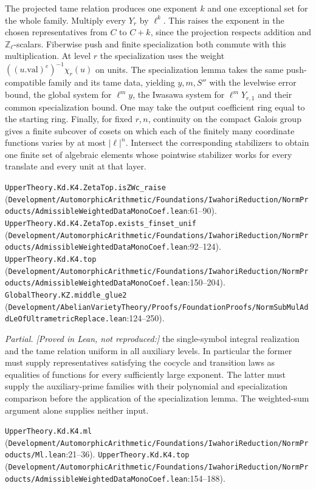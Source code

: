 The projected tame relation produces one exponent $k$ and one exceptional set for the whole family. Multiply every $Y_r$ by $\ell^k$. This raises the exponent in the chosen representatives from $C$ to $C+k$, since the projection respects addition and $\mathbb Z_\ell$-scalars. Fiberwise push and finite specialization both commute with this multiplication. At level $r$ the specialization uses the weight $((u.\mathrm{val})^e)^{-1}\chi_r(u)$ on units. The specialization lemma takes the same push-compatible family and its tame data, yielding $y,m,S''$ with the levelwise error bound, the global system for $\ell^m y$, the Iwasawa system for $\ell^m Y_{r,1}$ and their common specialization bound. One may take the output coefficient ring equal to the starting ring. Finally, for fixed $r,n$, continuity on the compact Galois group gives a finite subcover of cosets on which each of the finitely many coordinate functions varies by at most $|\ell|^n$. Intersect the corresponding stabilizers to obtain one finite set of algebraic elements whose pointwise stabilizer works for every translate and every unit at that layer.
\par{\footnotesize \nolinkurl{UpperTheory.Kd.K4.ZetaTop.isZWc_raise} (\nolinkurl{Development/AutomorphicArithmetic/Foundations/IwahoriReduction/NormProducts/AdmissibleWeightedDataMonoCoef.lean}\allowbreak:61--90). \nolinkurl{UpperTheory.Kd.K4.ZetaTop.exists_finset_unif} (\nolinkurl{Development/AutomorphicArithmetic/Foundations/IwahoriReduction/NormProducts/AdmissibleWeightedDataMonoCoef.lean}\allowbreak:92--124). \nolinkurl{UpperTheory.Kd.K4.top} (\nolinkurl{Development/AutomorphicArithmetic/Foundations/IwahoriReduction/NormProducts/AdmissibleWeightedDataMonoCoef.lean}\allowbreak:150--204). \nolinkurl{GlobalTheory.KZ.middle_glue2} (\nolinkurl{Development/AbelianVarietyTheory/Proofs/FoundationProofs/NormSubMulAddLeOfUltrametricReplace.lean}\allowbreak:124--250).\par}

\emph{Partial. [Proved in Lean, not reproduced:]} the single-symbol integral realization and the tame relation uniform in all auxiliary levels. In particular the former must supply representatives satisfying the cocycle and transition laws as equalities of functions for every sufficiently large exponent. The latter must supply the auxiliary-prime families with their polynomial and specialization comparison before the application of the specialization lemma. The weighted-sum argument alone supplies neither input.
\par{\footnotesize \nolinkurl{UpperTheory.Kd.K4.ml} (\nolinkurl{Development/AutomorphicArithmetic/Foundations/IwahoriReduction/NormProducts/Ml.lean}\allowbreak:21--36). \nolinkurl{UpperTheory.Kd.K4.top} (\nolinkurl{Development/AutomorphicArithmetic/Foundations/IwahoriReduction/NormProducts/AdmissibleWeightedDataMonoCoef.lean}\allowbreak:154--188).\par}


